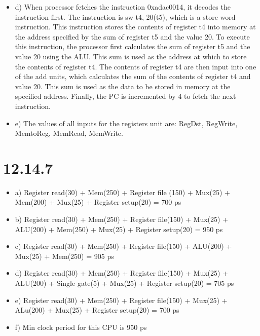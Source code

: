 \documentclass{article}
\begin{document}
\begin{itemize}
    \item d) When processor fetches the instruction 0xadac0014, it decodes the instruction first. The instruction is sw t4, 20(t5), which is a store word instruction. This instruction stores the contents of register t4 into memory at the address specified by the sum of register t5 and the value 20. \newline
    To execute this instruction, the processor first calculates the sum of register t5 and the value 20 using the ALU. This sum is used as the address at which to store the contents of register t4. The contents of register t4 are then input into one of the add units, which calculates the sum of the contents of register t4 and value 20. This sum is used as the data to be stored in memory at the specified address. Finally, the PC is incremented by 4 to fetch the next instruction. \newline
    
    \item e) The values of all inputs for the registers unit are: \newline
    RegDst, RegWrite, MemtoReg, MemRead, MemWrite. \newline
\end{itemize}

\section{12.14.7}

\begin{itemize}
    \item a) Register read(30) + Mem(250) + Register file (150) + Mux(25) + Mem(200) + Mux(25) + Register setup(20) = 700 ps\newline
    
    \item b) Register read(30) + Mem(250) + Register file(150) + Mux(25) + ALU(200) + Mem(250) + Mux(25) + Register setup(20) = 950 ps \newline
    
    \item c) Register read(30) + Mem(250) + Register file(150) + ALU(200) + Mux(25) + Mem(250) = 905 ps \newline
    
    \item d) Register read(30) + Mem(250) + Register file(150) + Mux(25) + ALU(200) + Single gate(5) + Mux(25) + Register setup(20) = 705 ps \newline
    
    \item e) Register read(30) + Mem(250) + Register file(150) + Mux(25) + ALu(200) + Mux(25) + Register setup(20) = 700 ps \newline
    
    \item f) Min clock period for this CPU is 950 ps \newline
\end{itemize}
\end{document}
